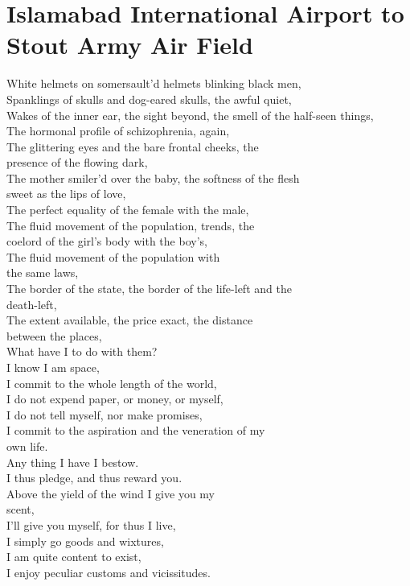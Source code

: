 \documentclass[smalldemyvopaper,11pt,twoside,onecolumn,openright,extrafontsizes]{memoir}
\begin{document}
\chapter{Islamabad International Airport to Stout Army Air Field}
White helmets on somersault'd helmets blinking black men,
\\Spanklings of skulls and dog-eared skulls, the awful quiet,
\\Wakes of the inner ear, the sight beyond, the smell of the half-seen things,
\\The hormonal profile of schizophrenia, again,
\\The glittering eyes and the bare frontal cheeks, the
\\presence of the flowing dark,
\\The mother smiler'd over the baby, the softness of the flesh
\\sweet as the lips of love,
\\The perfect equality of the female with the male,
\\The fluid movement of the population, trends, the
\\coelord of the girl's body with the boy's,
\\The fluid movement of the population with
\\the same laws,
\\The border of the state, the border of the life-left and the
\\death-left,
\\The extent available, the price exact, the distance
\\between the places,
\\What have I to do with them?
\\I know I am space,
\\I commit to the whole length of the world,
\\I do not expend paper, or money, or myself,
\\I do not tell myself, nor make promises,
\\I commit to the aspiration and the veneration of my
\\own life.
\\Any thing I have I bestow.
\\I thus pledge, and thus reward you.
\\Above the yield of the wind I give you my
\\scent,
\\I'll give you myself, for thus I live,
\\I simply go goods and wixtures,
\\I am quite content to exist,
\\I enjoy peculiar customs and vicissitudes.
\end{document}
